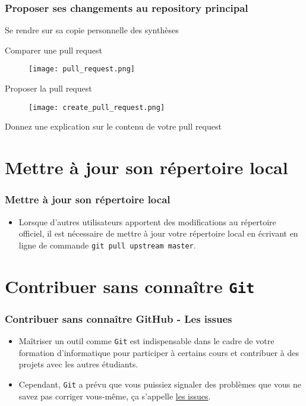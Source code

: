\documentclass{beamer}
\newenvironment{wideitemize}{\itemize\addtolength{\itemsep}{10pt}}{\enditemize}
\begin{document}
\begin{frame}
    \frametitle{Proposer ses changements au repository principal}
    \begin{wideitemize}
        \item Se rendre sur sa copie personnelle des synthèses
        \pause
        \item Comparer une pull request
            \begin{figure}[H]
                \centering
                \texttt{[image: pull\_request.png]}
            \end{figure}
         \pause
         \item Proposer la pull request
            \begin{figure}[H]
                \centering
                \texttt{[image: create\_pull\_request.png]}
            \end{figure}
         \pause
         \item Donnez une explication sur le contenu de votre pull request
     \end{wideitemize}
\end{frame}

\section{Mettre à jour son répertoire local}

\begin{frame}
    \frametitle{Mettre à jour son répertoire local}
    \begin{itemize}
        \item Lorsque d'autres utilisateurs apportent des modifications au répertoire officiel, il est nécessaire de mettre à jour votre répertoire local en écrivant en ligne de commande \lstinline[mathescape]|git pull upstream master|.
    \end{itemize}
\end{frame}

\section{Contribuer sans connaître \texttt{Git}}

\begin{frame}
    \frametitle{Contribuer sans connaître GitHub - Les issues}
    \begin{itemize}
        \item Ma\^itriser un outil comme \lstinline|Git| est indispensable dans le
            cadre de votre formation d'informatique pour participer à
            certains cours et contribuer à des projets avec les autres
            étudiants.
        \item Cependant, \lstinline|Git| a prévu que vous puissiez signaler des
            problèmes que vous ne savez pas corriger vous-même, ça
            s'appelle \href{https://github.com/Gp2mv3/Syntheses/issues}{les issues}.
    \end{itemize}
\end{frame}
\end{document}
